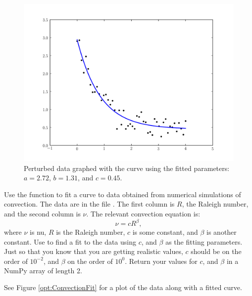 \begin{figure}
\includegraphics[width=\textwidth]{curve_fit.pdf}
\caption{Perturbed data graphed with the curve using the fitted parameters: $a=2.72$,  $b=1.31$, and $c=0.45$.}
\label{opt:curve_fit}
\end{figure}

\begin{problem}
Use the  function to fit a curve to data obtained from numerical simulations of convection.
The data are in the file . The first column is $R$, the Raleigh number, and the second column is $\nu$.
The relevant convection equation is:
\[
\nu = cR^\beta,
\]
where $\nu$ is nu, $R$ is the Raleigh number, $c$ is some constant, and $\beta$ is another constant. 
Use  to find a fit to the data using $c$, and $\beta$ as the fitting parameters.
Just so that you know that you are getting realistic values, $c$ should be on the order of $10^{-2}$, and $\beta$ on the order of $10^{0}$.
Return your values for $c$, and $\beta$ in a NumPy array of length 2.

See Figure \ref{opt:ConvectionFit} for a plot of the data along with a fitted curve.
\end{problem}

